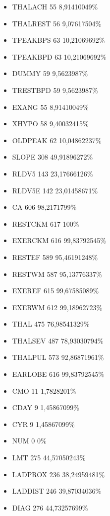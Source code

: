 \documentclass[a4paper,12pt]{article}
\begin{document}
\begin{itemize}
\begin{itemize}
                \item THALACH	55	8,91410049\%
                \item THALREST	56	9,07617504\%
                \item TPEAKBPS	63	10,21069692\%
                \item TPEAKBPD	63	10,21069692\%
                \item DUMMY	59	9,5623987\%
                \item TRESTBPD	59	9,5623987\%
                \item EXANG	55	8,91410049\%
                \item XHYPO	58	9,40032415\%
                \item OLDPEAK	62	10,04862237\%
                \item SLOPE	308	49,91896272\%
                \item RLDV5	143	23,17666126\%
                \item RLDV5E	142	23,01458671\%
                \item CA	606	98,2171799\%
                \item RESTCKM	617	100\%
                \item EXERCKM	616	99,83792545\%
                \item RESTEF	589	95,46191248\%
                \item RESTWM	587	95,13776337\%
                \item EXEREF	615	99,67585089\%
                \item EXERWM	612	99,18962723\%
                \item THAL	475	76,98541329\%
                \item THALSEV	487	78,93030794\%
                \item THALPUL	573	92,86871961\%
                \item EARLOBE	616	99,83792545\%
                \item CMO	11	1,7828201\%
                \item CDAY	9	1,45867099\%
                \item CYR	9	1,45867099\%
                \item NUM	0	0\%
                \item LMT	275	44,57050243\%
                \item LADPROX	236	38,24959481\%
                \item LADDIST	246	39,87034036\%
                \item DIAG	276	44,73257699\%

\end{itemize}
\end{itemize}
\end{document}
